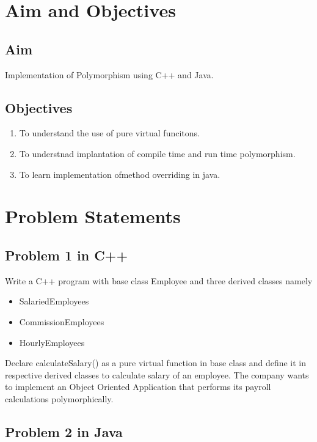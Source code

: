 \documentclass[11pt]{article}
\begin{document}
\tableofcontents
\thispagestyle{empty}
\clearpage


\setcounter{page}{1}

\section{Aim and Objectives}
\subsection*{Aim}
Implementation of Polymorphism using C++ and Java.

\subsection*{Objectives}
\begin{enumerate}
	\item To understand the use of pure virtual funcitons.
	\item To understnad implantation of compile time and run time polymorphism.
	\item To learn implementation ofmethod overriding in java.
\end{enumerate}

\section{Problem Statements}
\subsection{Problem 1 in C++}

Write a C++ program with base class Employee and three derived classes namely
\begin{itemize}
	\item SalariedEmployees
	\item CommissionEmployees
	\item HourlyEmployees
\end{itemize}

Declare calculateSalary() as a pure virtual function in base class and define it in respective
derived classes to calculate salary of an employee.
The company wants to implement an Object Oriented Application that performs its payroll
calculations polymorphically.


\subsection{Problem 2 in Java}
\end{document}
